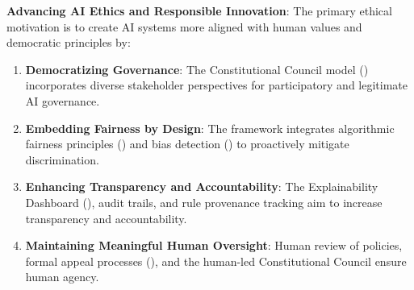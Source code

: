 \documentclass[manuscript,screen,review,anonymous,9pt]{acmart}
\begin{document}
\textbf{Advancing AI Ethics and Responsible Innovation}:
The primary ethical motivation is to create AI systems more aligned with human values and democratic principles by:
\begin{enumerate}[leftmargin=*,itemsep=1pt,parsep=1pt]
    \item \textbf{Democratizing Governance}: The Constitutional Council model () incorporates diverse stakeholder perspectives for participatory and legitimate AI governance.
    \item \textbf{Embedding Fairness by Design}: The framework integrates algorithmic fairness principles () and bias detection () to proactively mitigate discrimination.
    \item \textbf{Enhancing Transparency and Accountability}: The Explainability Dashboard (), audit trails, and rule provenance tracking aim to increase transparency and accountability.
    \item \textbf{Maintaining Meaningful Human Oversight}: Human review of policies, formal appeal processes (), and the human-led Constitutional Council ensure human agency.
\end{enumerate}
\end{document}
